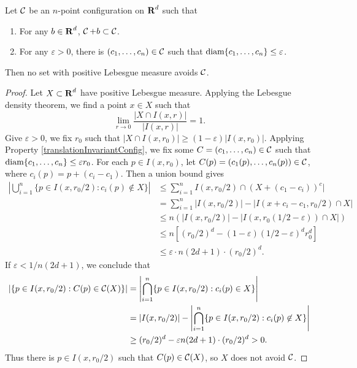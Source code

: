 \begin{theorem}
	Let $\operatorname{\mathcal{C}}$ be an $n$-point configuration on $\operatorname{\mathbf{R}}^d$ such that
	\begin{enumerate}
		\item \label{translationInvariantConfig} For any $b \in \operatorname{\mathbf{R}}^d$, $\operatorname{\mathcal{C}} + b \subset \operatorname{\mathcal{C}}$.
		\item \label{nonDiscreteConfig} For any $\varepsilon > 0$, there is $(c_1, \dots, c_n) \in \operatorname{\mathcal{C}}$ such that $\operatorname{\text{diam}} \{ c_1, \dots, c_n \} \leq \varepsilon$.
	\end{enumerate}
	Then no set with positive Lebesgue measure avoids $\operatorname{\mathcal{C}}$.
\end{theorem}
\begin{proof}
	Let $X \subset \operatorname{\mathbf{R}}^d$ have positive Lebesgue measure. Applying the Lebesgue density theorem, we find a point $x \in X$ such that
	\[ \lim_{r \to 0} \frac{|X \cap I(x,r)|}{|I(x,r)|} = 1. \]
	Give $\varepsilon > 0$, we fix $r_0$ such that $|X \cap I(x,r_0)| \geq (1 - \varepsilon)|I(x,r_0)|$. Applying Property \ref{translationInvariantConfig}, we fix some $C = (c_1, \dots, c_n) \in \operatorname{\mathcal{C}}$ such that $\operatorname{\text{diam}} \{ c_1, \dots, c_n \} \leq \varepsilon r_0$. For each $p \in I(x,r_0)$, let $C(p) = (c_1(p), \dots, c_n(p)) \in \operatorname{\mathcal{C}}$, where $c_i(p) = p + (c_i - c_1)$. Then a union bound gives
	\begin{align*}
		\left| \bigcup_{i = 1}^n \{ p \in I(x,r_0/2) : c_i(p) \not \in X \} \right| &\leq \sum_{i = 1}^n I(x,r_0/2) \cap (X + (c_1 - c_i))^c|\\
		&= \sum_{i = 1}^n |I(x,r_0/2)| - |I(x+c_i-c_1,r_0/2) \cap X|\\
		&\leq n \left( |I(x,r_0/2)| - |I(x,r_0(1/2 - \varepsilon)) \cap X| \right)\\
		&\leq n \left[ (r_0/2)^d - (1 - \varepsilon)(1/2 - \varepsilon)^d r_0^d \right] \\
		&\leq \varepsilon \cdot n (2d + 1) \cdot (r_0/2)^d.
	\end{align*}
	If $\varepsilon < 1/n(2d + 1)$, we conclude that
	\begin{align*}
		\left|\left\{ p \in I(x,r_0/2): C(p) \in \operatorname{\mathcal{C}}(X) \right\}\right| &= \left| \bigcap_{i = 1}^n \{ p \in I(x,r_0/2) : c_i(p) \in X \} \right|\\
		&= |I(x,r_0/2)| - \left| \bigcap_{i = 1}^n \{ p \in I(x,r_0/2) : c_i(p) \not \in X \} \right|\\
		&\geq (r_0/2)^d - \varepsilon n(2d + 1) \cdot (r_0/2)^d > 0.
	\end{align*}
	Thus there is $p \in I(x,r_0/2)$ such that $C(p) \in \operatorname{\mathcal{C}}(X)$, so $X$ does not avoid $\operatorname{\mathcal{C}}$.
\end{proof}

